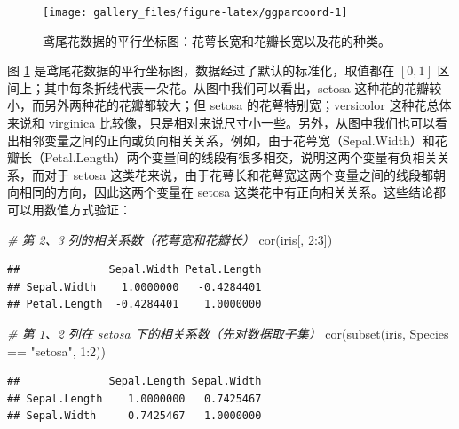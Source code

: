 \documentclass[
  b5paper,
  UTF8,twoside]{book}
\newenvironment{Shaded}{\begin{snugshade}}{\end{snugshade}}
\newcommand{\CommentTok}[1]{\textcolor[rgb]{0.56,0.35,0.01}{\textit{#1}}}
\newcommand{\DecValTok}[1]{\textcolor[rgb]{0.00,0.00,0.81}{#1}}
\newcommand{\FunctionTok}[1]{\textcolor[rgb]{0.00,0.00,0.00}{#1}}
\newcommand{\NormalTok}[1]{#1}
\newcommand{\SpecialCharTok}[1]{\textcolor[rgb]{0.00,0.00,0.00}{#1}}
\newcommand{\StringTok}[1]{\textcolor[rgb]{0.31,0.60,0.02}{#1}}
\begin{document}
\begin{figure}

{\centering \texttt{[image: gallery\_files/figure-latex/ggparcoord-1]} 

}

\caption[鸢尾花数据的平行坐标图]{鸢尾花数据的平行坐标图：花萼长宽和花瓣长宽以及花的种类。}\label{fig:ggparcoord}
\end{figure}

图 \ref{fig:ggparcoord} 是鸢尾花数据的平行坐标图，数据经过了默认的标准化，取值都在 \([0,1]\) 区间上；其中每条折线代表一朵花。从图中我们可以看出，setosa 这种花的花瓣较小，而另外两种花的花瓣都较大；但 setosa 的花萼特别宽；versicolor 这种花总体来说和 virginica 比较像，只是相对来说尺寸小一些。另外，从图中我们也可以看出相邻变量之间的正向或负向相关关系，例如，由于花萼宽（Sepal.Width）和花瓣长（Petal.Length）两个变量间的线段有很多相交，说明这两个变量有负相关关系，而对于 setosa 这类花来说，由于花萼长和花萼宽这两个变量之间的线段都朝向相同的方向，因此这两个变量在 setosa 这类花中有正向相关关系。这些结论都可以用数值方式验证：

\begin{Shaded}
\begin{Highlighting}[]
\CommentTok{\# 第 2、3 列的相关系数（花萼宽和花瓣长）}
\FunctionTok{cor}\NormalTok{(iris[, }\DecValTok{2}\SpecialCharTok{:}\DecValTok{3}\NormalTok{])}
\end{Highlighting}
\end{Shaded}

\begin{verbatim}
##              Sepal.Width Petal.Length
## Sepal.Width    1.0000000   -0.4284401
## Petal.Length  -0.4284401    1.0000000
\end{verbatim}

\begin{Shaded}
\begin{Highlighting}[]
\CommentTok{\# 第 1、2 列在 setosa 下的相关系数（先对数据取子集）}
\FunctionTok{cor}\NormalTok{(}\FunctionTok{subset}\NormalTok{(iris, Species }\SpecialCharTok{==} \StringTok{"setosa"}\NormalTok{, }\DecValTok{1}\SpecialCharTok{:}\DecValTok{2}\NormalTok{))}
\end{Highlighting}
\end{Shaded}

\begin{verbatim}
##              Sepal.Length Sepal.Width
## Sepal.Length    1.0000000   0.7425467
## Sepal.Width     0.7425467   1.0000000
\end{verbatim}
\end{document}

